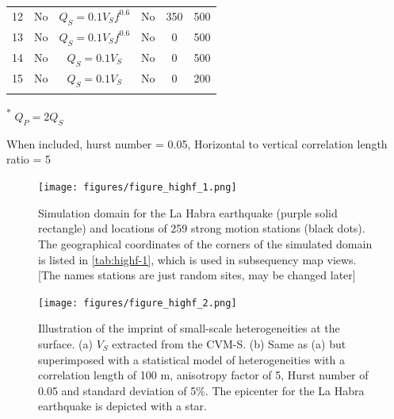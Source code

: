 \begin{table}[!ht]
\begin{threeparttable}
{\begin{tabular}{@{}cccccc@{}}
        12       & No         & $Q_S=0.1V_Sf^{0.6}$               & No                     & 350                   & 500                 \\
        13       & No         & $Q_S=0.1V_Sf^{0.6}$               & No                     & 0                     & 500                 \\
        14       & No         & $Q_S=0.1V_S$                      & No                     & 0                     & 500                 \\
        15       & No         & $Q_S=0.1V_S$                      & No                     & 0                     & 200                 \\\bottomrule
        \\[-5mm]
      \end{tabular}%
    }
    \begin{tablenotes}
      \item[\textsuperscript{*}] \footnotesize $Q_P=2Q_S$\\[-10pt]
      \item[\textdagger] \footnotesize When included, hurst number = 0.05, Horizontal to vertical correlation length ratio = 5
    \end{tablenotes}
  \end{threeparttable}
\end{table}
\clearpage


\begin{figure}[!ht]
  \centering
  \texttt{[image: figures/figure\_highf\_1.png]}
  \caption{Simulation domain for the La Habra earthquake (purple solid rectangle) and locations of 259 strong motion stations (black dots). The geographical coordinates of the corners of the simulated domain is listed in \cref{tab:highf-1}, which is used in subsequency map views. [The names stations are just random sites, may be changed later]}
  \label{fig:highf-1}
\end{figure}
\clearpage

\begin{figure}[!ht]
  \centering
  \texttt{[image: figures/figure\_highf\_2.png]}
  \caption{Illustration of the imprint of small-scale heterogeneities at the surface. (a) $V_S$ extracted from the CVM-S. (b) Same as (a) but superimposed with a statistical model of heterogeneities with a correlation length of 100 m, anisotropy factor of 5, Hurst number of 0.05 and standard deviation of 5\%. The epicenter for the La Habra earthquake is depicted with a star.}
  \label{fig:highf-2}
\end{figure}
\clearpage

